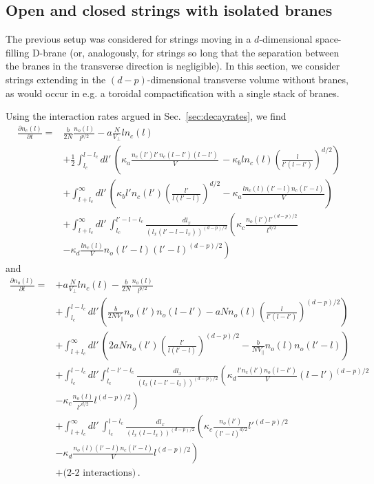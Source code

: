 \documentclass[a4paper,11pt]{article}
\newcommand{\lr}[1]{\left(#1\right)}
\begin{document}
\subsection{Open and closed strings with isolated branes}\label{sec:generalcase}

The previous setup was considered for strings moving in a $d$-dimensional 
space-filling D-brane (or, analogously, for strings so long that the separation between the branes in the transverse direction is negligible). 
In this section, we consider strings extending in the $(d-p)$-dimensional transverse volume without branes, as would occur in e.g. a toroidal compactification with a single stack of branes.

Using the interaction rates argued in Sec.~\ref{sec:decayrates}, we find
\begin{equation}\label{eq:boltzmannclosedgeneral}
\begin{split}
     \frac{\partial n_c(l)}{\partial t}= & \frac{b}{2N}\frac{n_o(l)}{l^{p/2}} -a\frac{N}{V_\perp}ln_c(l) \\ &
      +\frac{1}{2} \int_{l_c}^{l-l_c}{dl' \,\lr{\kappa_a\frac{n_c(l') l'\, n_c(l-l') (l-l')}{V}\, -\kappa_b ln_c(l) \lr{\frac{l}{l'(l-l')}}^{d/2}}}   \\ &
     + \int_{l+l_c}^\infty{dl' \,  \lr{\kappa_bl'n_c(l')\lr{\frac{l'}{l(l'-l)}}^{d/2}  -\kappa_a\frac{ln_c(l)(l'-l)n_c(l'-l)}{V} }} \, \\ &
    +\int_{l+l_c}^\infty{dl' \, \int_{l_c}^{l'-l-l_c}{  \frac{dl_x }{\lr{l_x(l'-l-l_x)}^{(d-p)/2}}}}\left(\kappa_c \frac{n_o(l')l'^{(d-p)/2}}{l^{d/2}}\right. \\ &-\left. \kappa_d\frac{l n_c(l)}{V}n_o(l'-l)(l'-l)^{(d-p)/2}\right) \, 
\end{split}
\end{equation}
and 
\\
\begin{equation}
    \begin{split}
        \frac{\partial n_o(l)}{\partial t}=&+a\frac{N}{V_\perp}ln_c(l)-\frac{b}{2N}\frac{n_o(l)}{l^{p/2}}\\
        &+\int_{l_c}^{l-l_c}{dl'\lr{\frac{b}{2NV_\parallel}n_o(l')n_o(l-l')-aNn_o(l)\lr{\frac{l}{l'(l-l')}}^{(d-p)/2}}} \\ 
        &+\int_{l+l_c}^{\infty}{dl'\, \lr{2aNn_o(l')\lr{\frac{l'}{l(l'-l)}}^{(d-p)/2} -\frac{b}{NV_\parallel }n_o(l)n_o(l'-l)}} \\
        &+\int_{l_c}^{l-l_c}dl' \int_{l_c}^{l-l'-l_c}\frac{dl_x}{\lr{l_x(l-l'-l_x)}^{(d-p)/2}}\left(\kappa_d \frac{l'n_c(l')n_o(l-l')}{V}(l-l')^{(d-p)/2}\right.  \\ & \left.-\kappa_c\frac{n_o(l)}{l'^{d/2}}l^{(d-p)/2} \right) \\
        &+\int_{l+l_c}^\infty dl'\, \int_{l_c}^{l-l_c}  \frac{dl_x }{\lr{l_x(l-l_x)}^{(d-p)/2}}\left(\kappa_c\frac{n_o(l')}{(l'-l)^{d/2}}l'^{(d-p)/2}\right. \\ 
        & \left.-\kappa_d \frac{n_o(l)(l'-l)n_c(l'-l)}{V}l^{(d-p)/2}\right) \\
        & +\text{(2-2 interactions)}\, .
    \end{split}
\end{equation}
\end{document}
